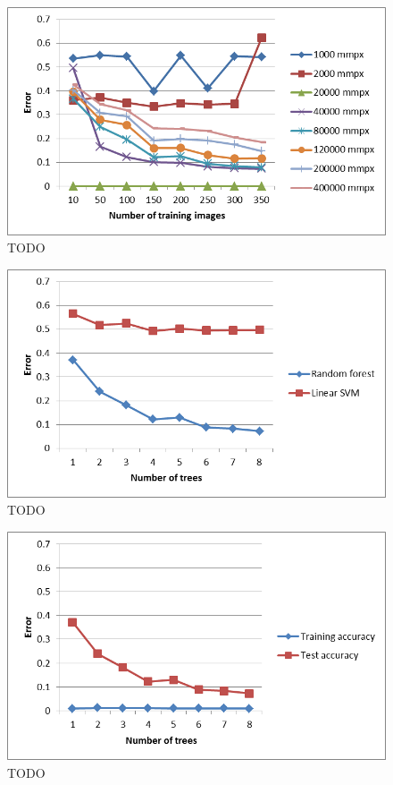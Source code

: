 \begin{figure}
\begin{center}
\includegraphics[width=0.45 \textwidth]{fig/varyradii.png}
\end{center}
\caption{TODO}
\label{fig:varyradii}
\end{figure}


\begin{figure}
\begin{center}
\includegraphics[width=0.45 \textwidth]{fig/linearsvm.png}
\end{center}
\caption{TODO}
\label{fig:linearsvm}
\end{figure}



\begin{figure}
\begin{center}
\includegraphics[width=0.45 \textwidth]{fig/trainingacc.png}
\end{center}
\caption{TODO}
\label{fig:trainingacc}
\end{figure}



